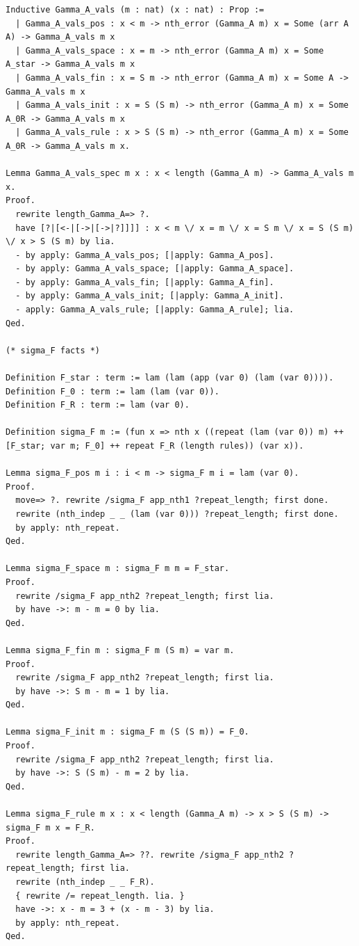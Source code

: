 \begin{lstlisting}
Inductive Gamma_A_vals (m : nat) (x : nat) : Prop :=
  | Gamma_A_vals_pos : x < m -> nth_error (Gamma_A m) x = Some (arr A A) -> Gamma_A_vals m x
  | Gamma_A_vals_space : x = m -> nth_error (Gamma_A m) x = Some A_star -> Gamma_A_vals m x
  | Gamma_A_vals_fin : x = S m -> nth_error (Gamma_A m) x = Some A -> Gamma_A_vals m x
  | Gamma_A_vals_init : x = S (S m) -> nth_error (Gamma_A m) x = Some A_0R -> Gamma_A_vals m x
  | Gamma_A_vals_rule : x > S (S m) -> nth_error (Gamma_A m) x = Some A_0R -> Gamma_A_vals m x.

Lemma Gamma_A_vals_spec m x : x < length (Gamma_A m) -> Gamma_A_vals m x.
Proof.
  rewrite length_Gamma_A=> ?.
  have [?|[<-|[->|[->|?]]]] : x < m \/ x = m \/ x = S m \/ x = S (S m) \/ x > S (S m) by lia.
  - by apply: Gamma_A_vals_pos; [|apply: Gamma_A_pos].
  - by apply: Gamma_A_vals_space; [|apply: Gamma_A_space].
  - by apply: Gamma_A_vals_fin; [|apply: Gamma_A_fin].
  - by apply: Gamma_A_vals_init; [|apply: Gamma_A_init].
  - apply: Gamma_A_vals_rule; [|apply: Gamma_A_rule]; lia.
Qed.

(* sigma_F facts *)

Definition F_star : term := lam (lam (app (var 0) (lam (var 0)))).
Definition F_0 : term := lam (lam (var 0)).
Definition F_R : term := lam (var 0).

Definition sigma_F m := (fun x => nth x ((repeat (lam (var 0)) m) ++ [F_star; var m; F_0] ++ repeat F_R (length rules)) (var x)).

Lemma sigma_F_pos m i : i < m -> sigma_F m i = lam (var 0).
Proof.
  move=> ?. rewrite /sigma_F app_nth1 ?repeat_length; first done.
  rewrite (nth_indep _ _ (lam (var 0))) ?repeat_length; first done.
  by apply: nth_repeat.
Qed.

Lemma sigma_F_space m : sigma_F m m = F_star.
Proof.
  rewrite /sigma_F app_nth2 ?repeat_length; first lia.
  by have ->: m - m = 0 by lia.
Qed.

Lemma sigma_F_fin m : sigma_F m (S m) = var m.
Proof.
  rewrite /sigma_F app_nth2 ?repeat_length; first lia.
  by have ->: S m - m = 1 by lia.
Qed.

Lemma sigma_F_init m : sigma_F m (S (S m)) = F_0.
Proof.
  rewrite /sigma_F app_nth2 ?repeat_length; first lia.
  by have ->: S (S m) - m = 2 by lia.
Qed.

Lemma sigma_F_rule m x : x < length (Gamma_A m) -> x > S (S m) -> sigma_F m x = F_R.
Proof.
  rewrite length_Gamma_A=> ??. rewrite /sigma_F app_nth2 ?repeat_length; first lia.
  rewrite (nth_indep _ _ F_R).
  { rewrite /= repeat_length. lia. }
  have ->: x - m = 3 + (x - m - 3) by lia.
  by apply: nth_repeat.
Qed.


\end{lstlisting}
